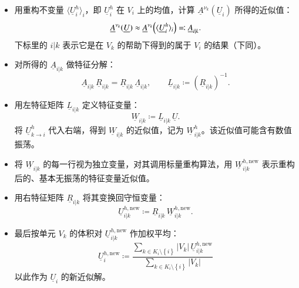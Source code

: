 \begin{itemize}
\item 用重构不变量 $\langle\underline{U}_{i}^{h}\rangle_{i}$，即 $\underline{U}_{i}^{h}$
在 $V_{i}$ 上的均值，计算 $\underline{A}^{\nu_{k}}(\underline{U}_{i})$ 所得的近似值：
\begin{equation}
\underline{A}^{\nu_{k}}(\underline{U})\approx\underline{A}^{\nu_{k}}\qty(\langle\underline{U}_{i}^{h}\rangle_{i})\eqqcolon\underline{A}_{i\vert k}.
\end{equation}
下标里的 $i\vert k$ 表示它是在 $V_{k}$ 的帮助下得到的属于 $V_{i}$ 的结果（下同）。
\item 对所得的 $\underline{A}_{i\vert k}$ 做特征分解：
\begin{equation}
\underline{A}_{i\vert k}\,\underline{R}_{i\vert k}=\underline{R}_{i\vert k}\,\underline{\varLambda}_{i\vert k},\qquad\underline{L}_{i\vert k}\coloneqq(\underline{R}_{i\vert k})^{-1}.\label{eq:eigen-decomposition}
\end{equation}
\item 用左特征矩阵 $\underline{L}_{i\vert k}$ 定义特征变量：
\begin{equation}
\underline{W}_{i\vert k}\coloneqq\underline{L}_{i\vert k}\,\underline{U}.
\end{equation}
将 $\underline{U}_{k\to i}^{h}$ 代入右端，得到 $\underline{W}_{i\vert k}$
的近似值，记为 $\underline{W}_{i\vert k}^{h}$。该近似值可能含有数值振荡。
\item 将 $\underline{W}_{i\vert k}$ 的每一行视为独立变量，对其调用标量重构算法，用 $\underline{W}_{i\vert k}^{h,\mathrm{new}}$
表示重构后的、基本无振荡的特征变量近似值。
\item 用右特征矩阵 $\underline{R}_{i\vert k}$ 将其变换回守恒变量：
\begin{equation}
\underline{U}_{i\vert k}^{h,\mathrm{new}}\coloneqq\underline{R}_{i\vert k}\,\underline{W}_{i\vert k}^{h,\mathrm{new}}.
\end{equation}
\item 最后按单元 $V_{k}$ 的体积对 $\underline{U}_{i\vert k}^{h,\mathrm{new}}$ 作加权平均：
\begin{equation}
\underline{U}_{i}^{h,\mathrm{new}}\coloneqq\frac{\sum_{k\in K_{i}\setminus\left\{ i\right\} }\vert V_{k}\vert\,\underline{U}_{i\vert k}^{h,\mathrm{new}}}{\sum_{k\in K_{i}\setminus\left\{ i\right\} }\vert V_{k}\vert}
\end{equation}
以此作为 $\underline{U}_{i}$ 的新近似解。
\end{itemize}

